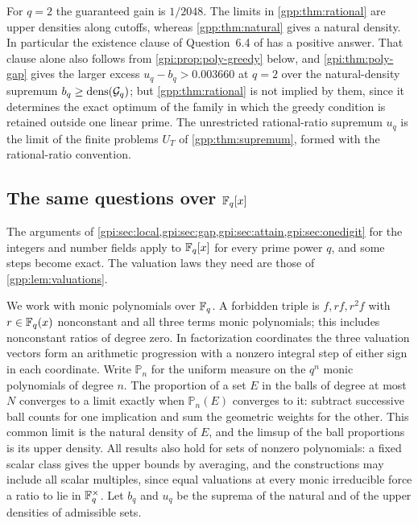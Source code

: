 For $q=2$ the guaranteed gain is $1/2048$. The limits in \cref{gpp:thm:rational} are
upper densities along cutoffs, whereas \cref{gpp:thm:natural} gives a natural density.
In particular the existence clause of Question~6.4 of \cite{Asada2017Subsets} has a
positive answer. That clause alone also follows from \cref{gpi:prop:poly-greedy} below,
and \cref{gpi:thm:poly-gap} gives the larger excess $u_q-b_q>0.003660$ at $q=2$ over the
natural-density supremum $b_q\ge\operatorname{dens}(\mathcal{G}_q)$; but \cref{gpp:thm:rational} is not
implied by them, since it determines the exact optimum of the family in which the greedy
condition is retained outside one linear prime. The unrestricted rational-ratio supremum
$u_q$ is the limit of the finite problems $U_T$ of \cref{gpp:thm:supremum}, formed with the
rational-ratio convention.

\subsection{The same questions over \texorpdfstring{$\mathbb{F}_q[x]$}{Fq[x]}}\label{gpi:sec:poly}
{\raggedright{}}

The arguments of \cref{gpi:sec:local,gpi:sec:gap,gpi:sec:attain,gpi:sec:onedigit} for the
integers and number fields apply to $\mathbb{F}_q[x]$ for every prime power $q$, and some steps
become exact. The valuation laws they need are those of \cref{gpp:lem:valuations}.

We work with monic polynomials over $\mathbb{F}_q$. A forbidden triple is $f,rf,r^2f$ with
$r\in\mathbb{F}_q(x)$ nonconstant and all three terms monic polynomials; this includes nonconstant
ratios of degree zero. In factorization coordinates the three valuation vectors form an
arithmetic progression with a nonzero integral step of either sign in each coordinate. Write
$\mathbb P_n$ for the uniform measure on the $q^n$ monic polynomials of degree $n$. The
proportion of a set $E$ in the balls of degree at most $N$ converges to a limit exactly when
$\mathbb P_n(E)$ converges to it: subtract successive ball counts for one implication and sum
the geometric weights for the other. This common limit is the natural density of $E$, and
the limsup of the ball proportions is its upper density. All results also hold for sets of
nonzero polynomials: a fixed scalar class gives the upper bounds by averaging, and the
constructions may include all scalar multiples, since equal valuations at every monic
irreducible force a ratio to lie in $\mathbb{F}_q^\times$. Let $b_q$ and $u_q$ be the suprema of the
natural and of the upper densities of admissible sets.

